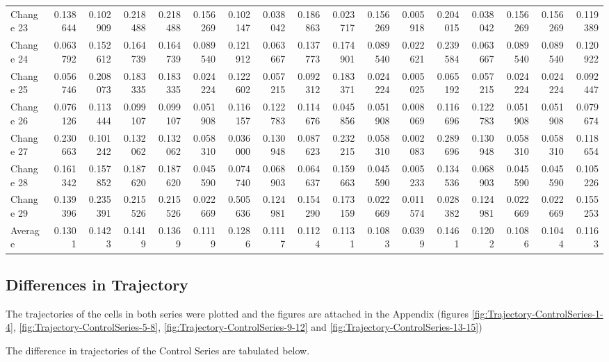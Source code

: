 \documentclass{article}
\begin{document}
\begin{landscape}
\begin{table}[htbp]
\begin{tabular}{lrrrrrrrrrrrrrrrr}
Change 23 & 0.138644 & 0.102909 & 0.218488 & 0.218488 & 0.156269 & 0.102147 & 0.038042 & 0.186863 & 0.023717 & 0.156269 & 0.005918 & 0.204015 & 0.038042 & 0.156269 & 0.156269 & 0.119389 \\
Change 24 & 0.063792 & 0.152612 & 0.164739 & 0.164739 & 0.089540 & 0.121912 & 0.063667 & 0.137773 & 0.174901 & 0.089540 & 0.022621 & 0.239584 & 0.063667 & 0.089540 & 0.089540 & 0.120922 \\
Change 25 & 0.056746 & 0.208073 & 0.183335 & 0.183335 & 0.024224 & 0.122602 & 0.057215 & 0.092312 & 0.183371 & 0.024224 & 0.005025 & 0.065192 & 0.057215 & 0.024224 & 0.024224 & 0.092447 \\
Change 26 & 0.076126 & 0.113444 & 0.099107 & 0.099107 & 0.051908 & 0.116157 & 0.122783 & 0.114676 & 0.045856 & 0.051908 & 0.008069 & 0.116696 & 0.122783 & 0.051908 & 0.051908 & 0.079674 \\
Change 27 & 0.230663 & 0.101242 & 0.132062 & 0.132062 & 0.058310 & 0.036000 & 0.130948 & 0.087623 & 0.232215 & 0.058310 & 0.002083 & 0.289696 & 0.130948 & 0.058310 & 0.058310 & 0.118654 \\
Change 28 & 0.161342 & 0.157852 & 0.187620 & 0.187620 & 0.045590 & 0.074740 & 0.068903 & 0.064637 & 0.159663 & 0.045590 & 0.005233 & 0.134536 & 0.068903 & 0.045590 & 0.045590 & 0.105226 \\
Change 29 & 0.139396 & 0.235391 & 0.215526 & 0.215526 & 0.022669 & 0.505636 & 0.124981 & 0.154290 & 0.173159 & 0.022669 & 0.011574 & 0.028382 & 0.124981 & 0.022669 & 0.022669 & 0.155253 \\
Average & 0.1301 & 0.1423 & 0.1419 & 0.1369 & 0.1119 & 0.1286 & 0.1117 & 0.1124 & 0.1131 & 0.1083 & 0.0399 & 0.1461 & 0.1202 & 0.1086 & 0.1044 & 0.1163 \\
\bottomrule
\end{tabular}
\end{table}
\end{landscape}

\subsection*{Differences in Trajectory}
The trajectories of the cells in both series were plotted and the figures are attached in the Appendix (figures \ref{fig:Trajectory-ControlSeries-1-4}, \ref{fig:Trajectory-ControlSeries-5-8}, \ref{fig:Trajectory-ControlSeries-9-12} and \ref{fig:Trajectory-ControlSeries-13-15})

The difference in trajectories of the Control Series are tabulated below. 
\end{document}
